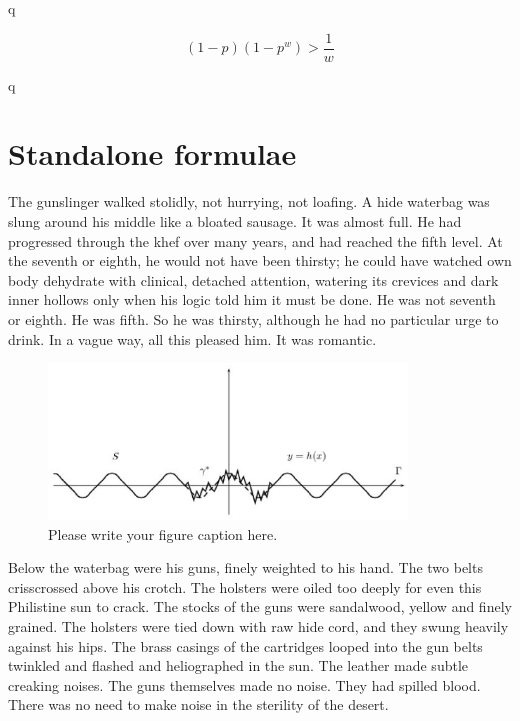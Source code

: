 \documentclass[
11pt,%
tightenlines,%
twoside,%
onecolumn,%
nofloats,%
nobibnotes,%
nofootinbib,%
superscriptaddress,%
noshowpacs,%
centertags]%
{revtex4}
\begin{document}
q

\begin{equation}
(1 - p)(1 - p^w) > \frac{1}{w}
\end{equation}

q

\section{Standalone formulae}

The gunslinger walked stolidly, not hurrying, not loafing. A hide waterbag was slung around his middle like a bloated sausage. It was almost full. He had progressed through the khef over many years, and had reached the fifth level. At the seventh or eighth, he would not have been thirsty; he could have watched own body dehydrate with clinical, detached attention, watering its crevices and dark inner hollows only when his logic told him it must be done. He was not seventh or eighth. He was fifth. So he was thirsty, although he had no particular urge to drink. In a vague way, all this pleased him. It was romantic.

\begin{figure}[h]
\setcaptionmargin{5mm}
\onelinecaptionstrue  %
\includegraphics[width=0.85\textwidth]{deform.eps}
\caption{Please write your figure caption here.}\label{fig:1}
\end{figure}

Below the waterbag were his guns, finely weighted to his hand. The two belts crisscrossed above his crotch. The holsters were oiled too deeply for even this Philistine sun to crack. The stocks of the guns were sandalwood, yellow and finely grained. The holsters were tied down with raw hide cord, and they swung heavily against his hips. The brass casings of the cartridges looped into the gun belts twinkled and flashed and heliographed in the sun. The leather made subtle creaking noises. The guns themselves made no noise. They had spilled blood. There was no need to make noise in the sterility of the desert.
\end{document}

